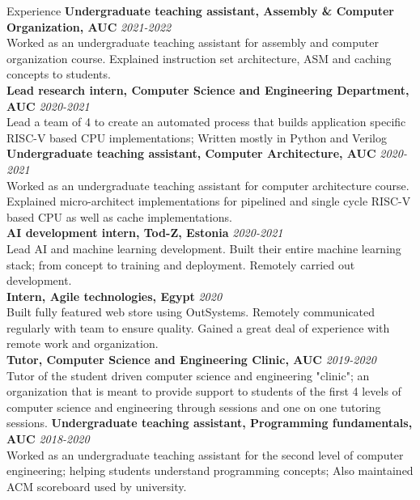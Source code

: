 \documentclass{resume}
\begin{document}
\begin{small}
	\begin{rSection}{Experience}
		{\bf Undergraduate teaching assistant, Assembly \& Computer Organization, AUC} \hfill {\em 2021-2022} \\
		Worked as an undergraduate teaching assistant for assembly and computer organization course. Explained instruction set architecture, ASM and caching concepts to students. \\
		{\bf Lead research intern, Computer Science and Engineering Department, AUC} \hfill {\em 2020-2021} \\
		Lead a team of 4 to create an automated process that builds application specific RISC-V based CPU implementations; Written mostly in Python and Verilog \\
		{\bf Undergraduate teaching assistant, Computer Architecture, AUC} \hfill {\em 2020-2021} \\
		Worked as an undergraduate teaching assistant for computer architecture course. Explained micro-architect implementations for pipelined and single cycle RISC-V based CPU as well as cache implementations. \\
		{\bf AI development intern, Tod-Z, Estonia} \hfill {\em 2020-2021} \\
		Lead AI and machine learning development. Built their entire machine learning stack; from concept to training and deployment. Remotely carried out development. \\
		{\bf Intern, Agile technologies, Egypt} \hfill {\em 2020} \\
		Built fully featured web store using OutSystems. Remotely communicated regularly with team to ensure quality. Gained a great deal of experience with remote work and organization. \\
		{\bf Tutor, Computer Science and Engineering Clinic, AUC} \hfill {\em 2019-2020} \\
		Tutor of the student driven computer science and engineering "clinic"; an organization that is meant to provide support to students of the first 4 levels of computer science and engineering through sessions and one on one tutoring sessions.
		{\bf Undergraduate teaching assistant, Programming fundamentals, AUC} \hfill {\em 2018-2020} \\
		Worked as an undergraduate teaching assistant for the second level of computer engineering; helping students understand programming concepts; Also maintained ACM scoreboard used by university. \\
	\end{rSection}


\end{small}
\end{document}
